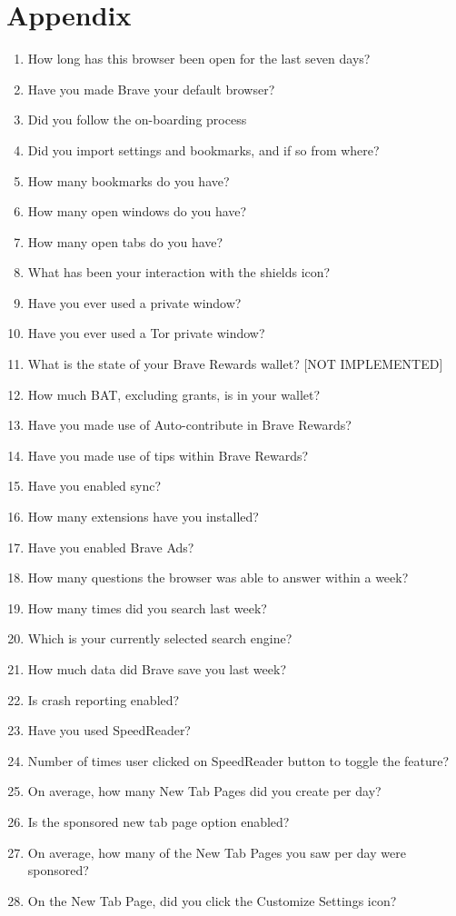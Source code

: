 \chapter{Appendix}
\label{chap:appendix}

\begin{enumerate}
    \label{list:brave_question}
    \item How long has this browser been open for the last seven days?
    \item Have you made Brave your default browser?
    \item Did you follow the on-boarding process
    \item Did you import settings and bookmarks, and if so from where?
    \item How many bookmarks do you have?
    \item How many open windows do you have?
    \item How many open tabs do you have?
    \item What has been your interaction with the shields icon?
    \item Have you ever used a private window?
    \item Have you ever used a Tor private window?
    \item What is the state of your Brave Rewards wallet? [NOT IMPLEMENTED]
    \item How much BAT, excluding grants, is in your wallet?
    \item  Have you made use of Auto-contribute in Brave Rewards?
    \item Have you made use of tips within Brave Rewards?
    \item Have you enabled sync?
    \item How many extensions have you installed?
    \item Have you enabled Brave Ads?
    \item How many questions the browser was able to answer within a week?
    \item How many times did you search last week?
    \item Which is your currently selected search engine?
    \item How much data did Brave save you last week?
    \item Is crash reporting enabled?
    \item Have you used SpeedReader?
    \item Number of times user clicked on SpeedReader button to toggle the feature?
    \item On average, how many New Tab Pages did you create per day?
    \item Is the sponsored new tab page option enabled?
    \item On average, how many of the New Tab Pages you saw per day were sponsored?
    \item On the New Tab Page, did you click the Customize Settings icon?
\end{enumerate}


